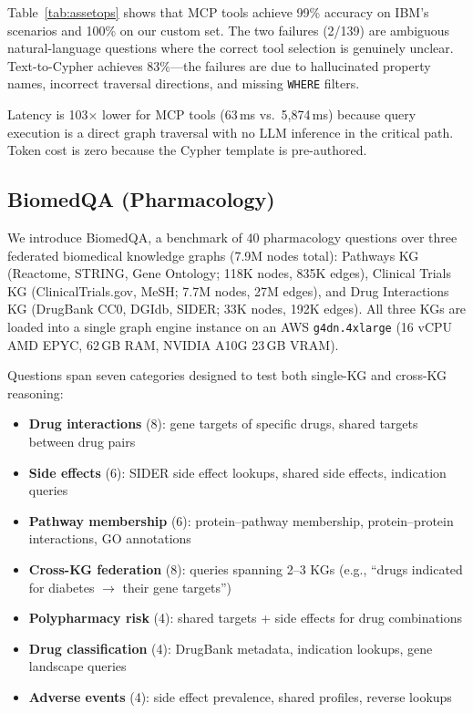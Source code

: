 \documentclass[sigconf]{acmart}
\begin{document}
Table~\ref{tab:assetops} shows that MCP tools achieve 99\% accuracy
on IBM's scenarios and 100\% on our custom set.
The two failures (2/139) are ambiguous natural-language questions
where the correct tool selection is genuinely unclear.
Text-to-Cypher achieves 83\%---the failures are due to hallucinated
property names, incorrect traversal directions, and missing
\texttt{WHERE} filters.

Latency is 103$\times$ lower for MCP tools (63\,ms vs.\ 5,874\,ms)
because query execution is a direct graph traversal with no
LLM inference in the critical path.  Token cost is zero because
the Cypher template is pre-authored.

\subsection{BiomedQA (Pharmacology)}

We introduce BiomedQA, a benchmark of 40 pharmacology questions
over three federated biomedical knowledge graphs (7.9M nodes
total): Pathways KG (Reactome, STRING, Gene Ontology;
118K nodes, 835K edges), Clinical Trials KG
(ClinicalTrials.gov, MeSH; 7.7M nodes, 27M edges), and
Drug Interactions KG (DrugBank CC0, DGIdb, SIDER;
33K nodes, 192K edges).  All three KGs are loaded into a
single graph engine instance on an AWS \texttt{g4dn.4xlarge}
(16 vCPU AMD EPYC, 62\,GB RAM, NVIDIA A10G 23\,GB VRAM).

Questions span seven categories designed to test both
single-KG and cross-KG reasoning:

\begin{itemize}[leftmargin=*,nosep]
\item \textbf{Drug interactions} (8): gene targets of specific drugs,
  shared targets between drug pairs
\item \textbf{Side effects} (6): SIDER side effect lookups,
  shared side effects, indication queries
\item \textbf{Pathway membership} (6): protein--pathway membership,
  protein--protein interactions, GO annotations
\item \textbf{Cross-KG federation} (8): queries spanning 2--3 KGs
  (e.g., ``drugs indicated for diabetes $\to$ their gene targets'')
\item \textbf{Polypharmacy risk} (4): shared targets + side effects
  for drug combinations
\item \textbf{Drug classification} (4): DrugBank metadata,
  indication lookups, gene landscape queries
\item \textbf{Adverse events} (4): side effect prevalence,
  shared profiles, reverse lookups
\end{itemize}
\end{document}
